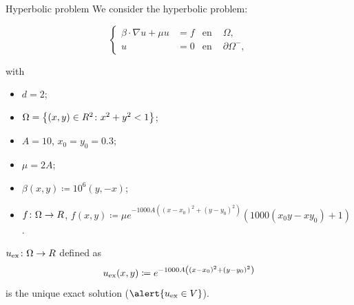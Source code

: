 
\begin{frame}{Hyperbolic problem}
	\scriptsize
	We consider the hyperbolic problem:
	\begin{block}{}
	\begin{equation*}
	\left\{
	\begin{aligned}
	\beta\cdot\nabla u+\mu u&=f & \text{en } &\Omega, \\
	u&=0 & \text{en } &\partial\Omega^-,
	\end{aligned}
	\right.
	\end{equation*}
	\end{block}
	with
	\begin{itemize}
		\item $d=2$;
		\item $\Omega=\left\{(x,y)\in\relax R^2\colon x^2+y^2<1 \right\}$;
		\item $A=10$, $x_0=y_0=0.3$;
		\item $\mu=2A$;
		\item $\beta(x,y)\coloneqq10^6(y,-x)$;
		\item $f\colon\Omega\to\relax R$, $f(x,y)\coloneqq \mu e^{-1000A\left((x-x_0)^2+(y-y_0)^2\right)}(1000(x_0 y -x y_0) + 1)$.
	\end{itemize}
	
	\vspace*{0.3cm}
	$u_{\text{ex}}\colon\Omega\to\relax R$ defined as
	\begin{equation*}
	u_{\text{ex}} (x,y)\coloneqq e^{-1000A\left((x-x_0)^2+(y-y_0)^2\right)}
	\end{equation*}
	is the \alert{unique exact solution} ($\alert{u_\text{ex}\in V}$).
	
	\end{frame}

